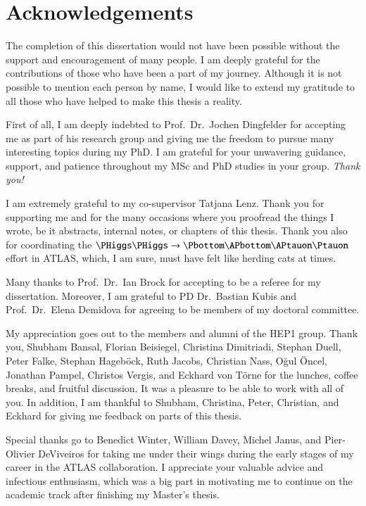 \chapter{Acknowledgements}

The completion of this dissertation would not have been possible without the
support and encouragement of many people. I am deeply grateful for the
contributions of those who have been a part of my journey. Although it is not
possible to mention each person by name, I would like to extend my gratitude to
all those who have helped to make this thesis a reality.

First of all, I am deeply indebted to Prof.\ Dr.\ Jochen Dingfelder for
accepting me as part of his research group and giving me the freedom to pursue
many interesting topics during my PhD. I am grateful for your unwavering
guidance, support, and patience throughout my MSc and PhD studies in your
group. \emph{Thank you!}

I am extremely grateful to my co-supervisor Tatjana Lenz. Thank you for
supporting me and for the many occasions where you proofread the things I
wrote, be it abstracts, internal notes, or chapters of this thesis. Thank you
also for coordinating the $\HH \to \bbtautau$ effort in ATLAS, which, I am sure,
must have felt like herding cats at times.

Many thanks to Prof.\ Dr.\ Ian Brock for accepting to be a referee for my
dissertation. Moreover, I am grateful to PD Dr.\ Bastian Kubis and Prof.\ Dr.\
Elena Demidova for agreeing to be members of my doctoral committee.

My appreciation goes out to the members and alumni of the \textsc{HEP1}
group. Thank you, Shubham Bansal, Florian Beisiegel, Christina Dimitriadi,
Stephan Duell, Peter Falke, Stephan Hageböck, Ruth Jacobs, Christian Nass, Oğul
Öncel, Jonathan Pampel, Christos Vergis, and Eckhard von Törne for the lunches,
coffee breaks, and fruitful discussion. It was a pleasure to be able to work
with all of you. In addition, I am thankful to Shubham, Christina, Peter,
Christian, and Eckhard for giving me feedback on parts of this thesis.

Special thanks go to Benedict Winter, William Davey, Michel Janus, and
Pier-Olivier DeViveiros for taking me under their wings during the early stages
of my career in the ATLAS collaboration. I appreciate your valuable advice and
infectious enthusiasm, which was a big part in motivating me to continue on the
academic track after finishing my Master's thesis.

